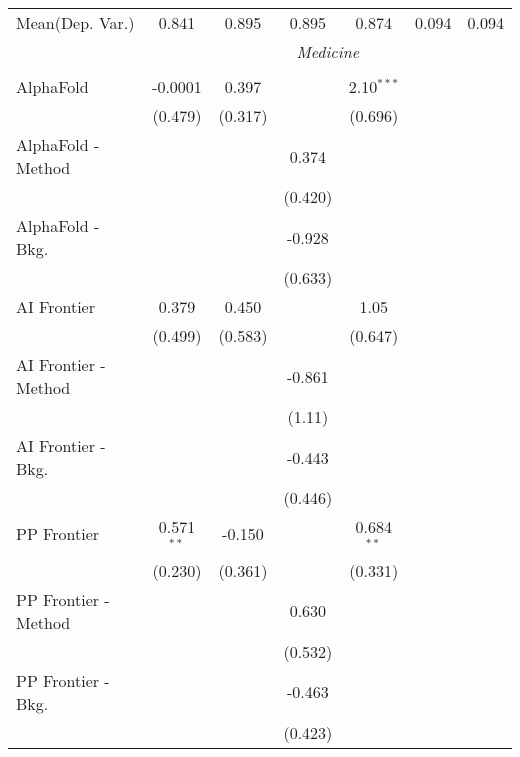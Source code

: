 \begin{tabular}{lcccccc}
Mean(Dep. Var.) & 0.841 & 0.895 & 0.895 & 0.874 & 0.094 & 0.094 \\
 & \multicolumn{6}{c}{\textit{Medicine}} \\ \\
   AlphaFold            & -0.0001      & 0.397         &         & 2.10$^{***}$ &        &   \\   
                        & (0.479)      & (0.317)       &         & (0.696)      &        &   \\   
   AlphaFold - Method   &              &               & 0.374   &              &        &   \\   
                        &              &               & (0.420) &              &        &   \\   
   AlphaFold - Bkg.     &              &               & -0.928  &              &        &   \\   
                        &              &               & (0.633) &              &        &   \\   
   AI Frontier          & 0.379        & 0.450         &         & 1.05         &        &   \\   
                        & (0.499)      & (0.583)       &         & (0.647)      &        &   \\   
   AI Frontier - Method &              &               & -0.861  &              &        &   \\   
                        &              &               & (1.11)  &              &        &   \\   
   AI Frontier - Bkg.   &              &               & -0.443  &              &        &   \\   
                        &              &               & (0.446) &              &        &   \\   
   PP Frontier          & 0.571$^{**}$ & -0.150        &         & 0.684$^{**}$ &        &   \\   
                        & (0.230)      & (0.361)       &         & (0.331)      &        &   \\   
   PP Frontier - Method &              &               & 0.630   &              &        &   \\   
                        &              &               & (0.532) &              &        &   \\   
   PP Frontier - Bkg.   &              &               & -0.463  &              &        &   \\   
                        &              &               & (0.423) &              &        &   \\   

\end{tabular}
